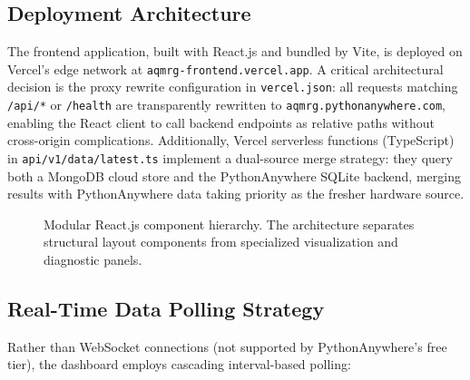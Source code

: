 \documentclass[12pt,a4paper]{article}
\begin{document}
\subsection{Deployment Architecture}
The frontend application, built with React.js and bundled by Vite, is deployed on Vercel's edge network at \texttt{aqmrg-frontend.vercel.app}. A critical architectural decision is the proxy rewrite configuration in \texttt{vercel.json}: all requests matching \texttt{/api/*} or \texttt{/health} are transparently rewritten to \texttt{aqmrg.pythonanywhere.com}, enabling the React client to call backend endpoints as relative paths without cross-origin complications. Additionally, Vercel serverless functions (TypeScript) in \texttt{api/v1/data/latest.ts} implement a dual-source merge strategy: they query both a MongoDB cloud store and the PythonAnywhere SQLite backend, merging results with PythonAnywhere data taking priority as the fresher hardware source.

\begin{figure}[H]
\centering
{}
\caption{Modular React.js component hierarchy. The architecture separates structural layout components from specialized visualization and diagnostic panels.}
\label{fig:component_tree}
\end{figure}

\subsection{Real-Time Data Polling Strategy}
Rather than WebSocket connections (not supported by PythonAnywhere's free tier), the dashboard employs cascading interval-based polling:
\end{document}

